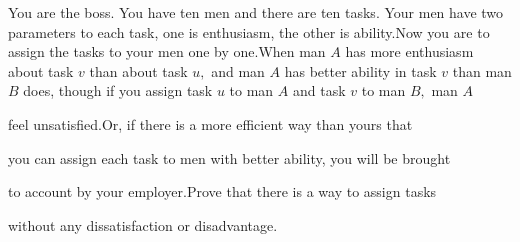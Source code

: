 You are the boss. You have ten men and there are ten tasks. Your men have two parameters to each task, one is enthusiasm, the other is ability.Now you are to assign the tasks to your men one by one.When man $A$ has more enthusiasm about task $v$ than about task $u,$ and man $A$ has better ability in task $v$ than man $B$ does, though if you assign task $u$ to man $A$ and task $v$ to man $B,$ man $A$

 feel unsatisfied.Or, if there is a more efficient way than yours that 

you can assign each task to men with better ability, you will be brought

 to account by your employer.Prove that there is a way to assign tasks 

without any dissatisfaction or disadvantage.